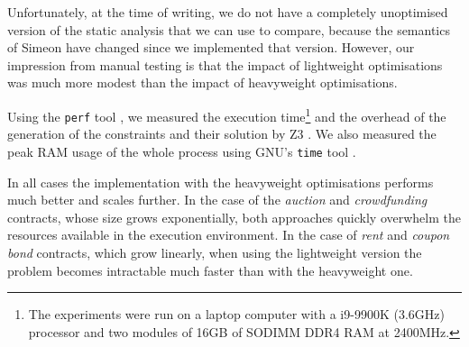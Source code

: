 \documentclass[english,runningheads]{llncs}
\begin{document}
Unfortunately, at the time of writing, we do not have a completely unoptimised
version of the static analysis that we can use to compare, because the semantics
of Simeon have changed since we implemented that version. However, our impression
from manual testing is that the impact of lightweight optimisations was much more modest than the impact of heavyweight optimisations.

Using the \texttt{perf} tool \cite{perf}, we measured the execution
time\footnote{The experiments were run on a laptop computer with a
i9-9900K (3.6GHz) processor and two modules of 16GB of SODIMM DDR4 RAM at 2400MHz.}
and the overhead of the generation of the constraints and their solution
by Z3 \cite{de2008z3}. We also measured the peak RAM usage of the whole
process using GNU's \texttt{time} tool \cite{keppel1998gnu}.

In all cases the implementation with the heavyweight optimisations
performs much better and scales further. In the case of the \textit{auction}
and \textit{crowdfunding} contracts, whose size grows exponentially, both
approaches quickly overwhelm the resources available in the execution environment.
In the case of \textit{rent} and \textit{coupon bond} contracts,
which grow linearly, when using the lightweight version the problem becomes 
intractable much faster than with the heavyweight one.
\end{document}
